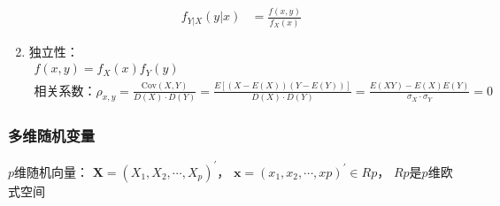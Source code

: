 \documentclass[12pt]{book}
\begin{document}
\begin{enumerate}[1.]
\begin{align*}
        f_{Y|X}(y|x) &= \frac{f(x,y)}{f_{X}(x)}
    \end{align*}
    \item 独立性：
    \begin{gather*}
        f(x,y) = f_{X}(x) f_{Y}(y) \\
        \text{相关系数：}\rho_{x,y} = \frac{\mathrm{Cov}(X,Y)}{D(X)\cdot D(Y)}
        = \frac{E[(X-E(X))(Y-E(Y))]}{D(X)\cdot D(Y)} 
        =\frac{E(XY)-E(X)E(Y)}{\sigma_X\cdot \sigma_Y} = 0
    \end{gather*}
\end{enumerate}


\subsubsection{多维随机变量}


$p$维随机向量：
$\mathbf{X}=(X_1,X_2,\cdots,X_p)^\prime$，
$ \mathbf{x} = (x_1,x_2,\cdots,xp)^\prime \in Rp$，
$Rp$是$p$维欧式空间
\end{document}
